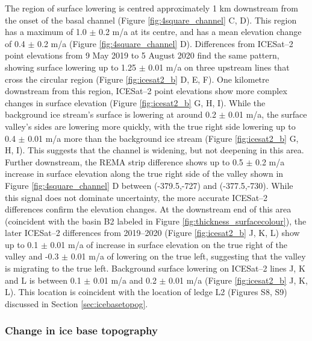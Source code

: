 \newpage
The region of surface lowering is centred  approximately 1 km downstream from the onset of the basal channel (Figure \ref{fig:4square_channel} C, D). This region has a maximum of 1.0 $\pm$ 0.2 m/a at its centre, and has a mean elevation change of 0.4 $\pm$ 0.2 m/a (Figure \ref{fig:4square_channel} D).  Differences from ICESat--2 point elevations from 9 May 2019 to 5 August 2020 find the same pattern, showing surface lowering up to 1.25 $\pm$ 0.01 m/a on three upstream lines that cross the circular region (Figure \ref{fig:icesat2_b} D, E, F). 
One kilometre downstream from this region, ICESat--2 point elevations show more complex changes in surface elevation (Figure \ref{fig:icesat2_b} G, H, I). While the background ice stream's surface is lowering at around 0.2 $\pm$ 0.01 m/a, the surface valley's sides are lowering more quickly, with the true right side  lowering up to 0.4 $\pm$ 0.01 m/a more than the background ice stream (Figure \ref{fig:icesat2_b} G, H, I).  This suggests that the channel is widening, but not deepening in this area.
Further downstream, the REMA strip difference shows up to 0.5 $\pm$ 0.2 m/a increase in surface elevation along the true right side of the valley shown in Figure \ref{fig:4square_channel} D between (-379.5,-727) and (-377.5,-730). While this signal does not dominate uncertainty, the more accurate ICESat--2 differences confirm the elevation changes.  At the downstream end of this area (coincident with the basin B2 labeled in Figure \ref{fig:thickness_surfacecolour}), the later ICESat--2 differences from 2019--2020 (Figure \ref{fig:icesat2_b} J, K, L) show up to 0.1 $\pm$ 0.01  m/a of increase in surface elevation on the true right of the valley and -0.3 $\pm$ 0.01 m/a of lowering on the true left, suggesting that the valley is migrating to the true left. Background surface lowering on ICESat--2 lines J, K and L is between 0.1 $\pm$ 0.01 m/a and 0.2 $\pm$ 0.01 m/a (Figure \ref{fig:icesat2_b} J, K, L). This location is coincident with the location of ledge L2 (Figures S8, S9) discussed in Section \ref{sec:icebasetopog}. 
 

\subsubsection{Change in ice base topography} \label{sec:changeinbase}

